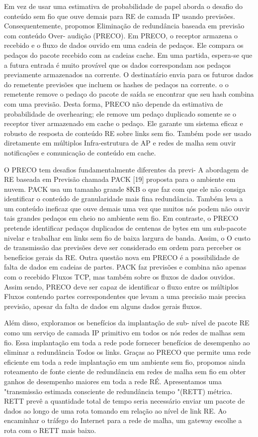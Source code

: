 \documentclass[12pt]{article}
\begin{document}
Em vez de usar uma estimativa de probabilidade de
papel aborda o desafio do conteúdo sem fio que ouve demais
para RE de camada IP usando previsões. Consequentemente, propomos
Eliminação de redundância baseada em previsão com conteúdo Over-
audição (PRECO). Em PRECO, o receptor armazena o recebido
e o fluxo de dados ouvido em uma cadeia de pedaços. Ele compara
os pedaços do pacote recebido com as cadeias
cache. Em uma partida, espera-se que a futura entrada
é muito provável que os dados correspondam aos pedaços previamente armazenados
na corrente. O destinatário envia para os futuros dados do remetente
previsões que incluem os hashes de pedaços na corrente. o
o remetente remove o pedaço do pacote de saída se encontrar
que seu hash combina com uma previsão. Desta forma, PRECO
não depende da estimativa de probabilidade de overhearing; ele remove
um pedaço duplicado somente se o receptor tiver armazenado em cache o pedaço.
Ele garante um sistema eficaz e robusto de resposta de conteúdo RE
sobre links sem fio. Também pode ser usado diretamente em múltiplos
Infra-estrutura de AP e redes de malha sem ouvir
notificações e comunicação de conteúdo em cache.



O PRECO tem desafios fundamentalmente diferentes da previ-
A abordagem de RE baseada em Previsão chamada PACK [19] proposta
para o ambiente em nuvem. PACK usa um tamanho grande
8KB o que faz com que ele não consiga identificar o conteúdo de granularidade mais fina
redundância. Também leva a um conteúdo ineficaz que ouve demais
uma vez que muitos nós podem não ouvir tais grandes pedaços em
cheio no ambiente sem fio. Em contraste, o PRECO pretende
identificar pedaços duplicados de centenas de bytes em um sub-pacote
nivelar e trabalhar em links sem fio de baixa largura de banda. Assim, o
O custo de transmissão das previsões deve ser considerado em ordem
para perceber os benefícios gerais da RE. Outra questão nova em
PRECO é a possibilidade de falta de dados em cadeias de partes.
PACK faz previsões e combina não apenas com o recebido
Fluxos TCP, mas também sobre os fluxos de dados ouvidos. Assim sendo,
PRECO deve ser capaz de identificar o fluxo entre os múltiplos
Fluxos contendo partes correspondentes que levam a uma precisão mais precisa
previsão, apesar da falta de dados em alguns dados gerais
fluxos.


Além disso, exploramos os benefícios da implantação de sub-
nível de pacote RE como um serviço de camada IP primitivo em todos os nós
redes de malhas sem fio. Essa implantação em toda a rede pode
fornecer benefícios de desempenho ao eliminar a redundância
Todos os links. Graças ao PRECO que permite uma rede eficiente em toda a rede
implantação em um ambiente sem fio, propomos ainda
roteamento de fonte ciente de redundância em redes de malha sem fio em
obter ganhos de desempenho maiores em toda a rede
RÉ. Apresentamos uma "transmissão estimada consciente de redundância
tempo "(RETT) métrica. RETT prevê a quantidade total de tempo
seria necessário enviar um pacote de dados ao longo de uma rota tomando
em relação ao nível de link RE. Ao encaminhar o tráfego do
Internet para a rede de malha, um gateway escolhe a rota com
o RETT mais baixo.
\end{document}
